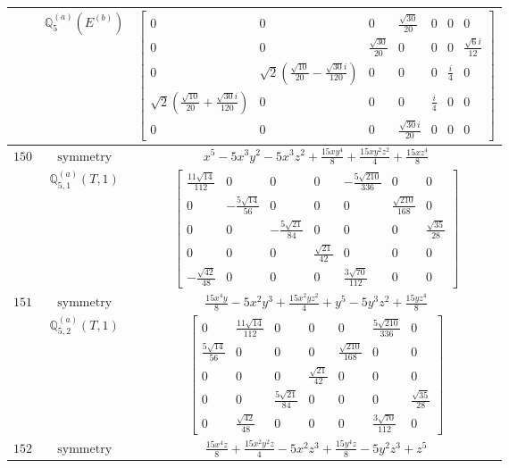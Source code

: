 \documentclass[fleqn,8pt,landscape]{jsarticle}
\begin{document}
\begin{longtable}{ccc}
$  $ & $ \mathbb{Q}_{5}^{(a)}(E^{(b)}) $ & $ \begin{bmatrix} 0 & 0 & 0 & \frac{\sqrt{30}}{20} & 0 & 0 & 0 \\ 0 & 0 & \frac{\sqrt{30}}{20} & 0 & 0 & 0 & \frac{\sqrt{6} i}{12} \\ 0 & \sqrt{2} \left(\frac{\sqrt{10}}{20} - \frac{\sqrt{30} i}{120}\right) & 0 & 0 & 0 & \frac{i}{4} & 0 \\ \sqrt{2} \left(\frac{\sqrt{10}}{20} + \frac{\sqrt{30} i}{120}\right) & 0 & 0 & 0 & \frac{i}{4} & 0 & 0 \\ 0 & 0 & 0 & \frac{\sqrt{30} i}{20} & 0 & 0 & 0 \end{bmatrix} $ \\ \hline
$ 150 $ & $ \text{symmetry} $ & $ x^{5} - 5 x^{3} y^{2} - 5 x^{3} z^{2} + \frac{15 x y^{4}}{8} + \frac{15 x y^{2} z^{2}}{4} + \frac{15 x z^{4}}{8} $ \\
$  $ & $ \mathbb{Q}_{5,1}^{(a)}(T,1) $ & $ \begin{bmatrix} \frac{11 \sqrt{14}}{112} & 0 & 0 & 0 & - \frac{5 \sqrt{210}}{336} & 0 & 0 \\ 0 & - \frac{5 \sqrt{14}}{56} & 0 & 0 & 0 & \frac{\sqrt{210}}{168} & 0 \\ 0 & 0 & - \frac{5 \sqrt{21}}{84} & 0 & 0 & 0 & \frac{\sqrt{35}}{28} \\ 0 & 0 & 0 & \frac{\sqrt{21}}{42} & 0 & 0 & 0 \\ - \frac{\sqrt{42}}{48} & 0 & 0 & 0 & \frac{3 \sqrt{70}}{112} & 0 & 0 \end{bmatrix} $ \\ \hline
$ 151 $ & $ \text{symmetry} $ & $ \frac{15 x^{4} y}{8} - 5 x^{2} y^{3} + \frac{15 x^{2} y z^{2}}{4} + y^{5} - 5 y^{3} z^{2} + \frac{15 y z^{4}}{8} $ \\
$  $ & $ \mathbb{Q}_{5,2}^{(a)}(T,1) $ & $ \begin{bmatrix} 0 & \frac{11 \sqrt{14}}{112} & 0 & 0 & 0 & \frac{5 \sqrt{210}}{336} & 0 \\ \frac{5 \sqrt{14}}{56} & 0 & 0 & 0 & \frac{\sqrt{210}}{168} & 0 & 0 \\ 0 & 0 & 0 & \frac{\sqrt{21}}{42} & 0 & 0 & 0 \\ 0 & 0 & \frac{5 \sqrt{21}}{84} & 0 & 0 & 0 & \frac{\sqrt{35}}{28} \\ 0 & \frac{\sqrt{42}}{48} & 0 & 0 & 0 & \frac{3 \sqrt{70}}{112} & 0 \end{bmatrix} $ \\ \hline
$ 152 $ & $ \text{symmetry} $ & $ \frac{15 x^{4} z}{8} + \frac{15 x^{2} y^{2} z}{4} - 5 x^{2} z^{3} + \frac{15 y^{4} z}{8} - 5 y^{2} z^{3} + z^{5} $ \\

\end{longtable}
\end{document}
